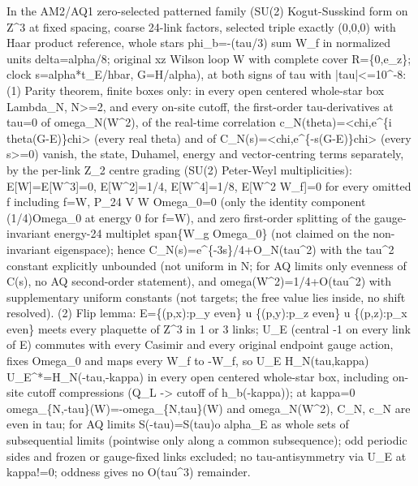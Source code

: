 \begin{gatequote}
In the AM2/AQ1 zero-selected patterned family (SU(2) Kogut-Susskind form on
Z\textasciicircum{}3 at fixed spacing, coarse 24-link factors, selected triple
exactly (0,0,0) with Haar product reference, whole stars phi\_b=-(tau/3) sum
W\_f in normalized units delta=alpha/8; original xz Wilson loop W with
complete cover R=\{0,e\_z\}; clock s=alpha*t\_E/hbar, G=H/alpha), at both
signs of tau with |tau|<=10\textasciicircum{}-8: (1) Parity theorem, finite
boxes only: in every open centered whole-star box Lambda\_N, N>=2, and every
on-site cutoff, the first-order tau-derivatives at tau=0 of
omega\_N(W\textasciicircum{}2), of the real-time correlation
c\_N(theta)=<chi,e\textasciicircum{}\{i theta(G-E)\}chi> (every real theta)
and of C\_N(s)=<chi,e\textasciicircum{}\{-s(G-E)\}chi> (every s>=0) vanish,
the state, Duhamel, energy and vector-centring terms separately, by the
per-link Z\_2 centre grading (SU(2) Peter-Weyl multiplicities):
E[W]=E[W\textasciicircum{}3]=0, E[W\textasciicircum{}2]=1/4,
E[W\textasciicircum{}4]=1/8, E[W\textasciicircum{}2 W\_f]=0 for every omitted
f including f=W, P\_24 V W Omega\_0=0 (only the identity component
(1/4)Omega\_0 at energy 0 for f=W), and zero first-order splitting of the
gauge-invariant energy-24 multiplet span\{W\_g Omega\_0\} (not claimed on the
non-invariant eigenspace); hence
C\_N(s)=e\textasciicircum{}\{-3s\}/4+O\_N(tau\textasciicircum{}2) with the
tau\textasciicircum{}2 constant explicitly unbounded (not uniform in N; for AQ
limits only evenness of C(s), no AQ second-order statement), and
omega(W\textasciicircum{}2)=1/4+O(tau\textasciicircum{}2) with supplementary
uniform constants (not targets; the free value lies inside, no shift
resolved). (2) Flip lemma: E=\{(p,x):p\_y even\} u \{(p,y):p\_z even\} u
\{(p,z):p\_x even\} meets every plaquette of Z\textasciicircum{}3 in 1 or 3
links; U\_E (central -1 on every link of E) commutes with every Casimir and
every original endpoint gauge action, fixes Omega\_0 and maps every W\_f to
-W\_f, so U\_E H\_N(tau,kappa) U\_E\textasciicircum{}*=H\_N(-tau,-kappa) in
every open centered whole-star box, including on-site cutoff compressions
(Q\_L -> cutoff of h\_b(-kappa)); at kappa=0
omega\_\{N,-tau\}(W)=-omega\_\{N,tau\}(W) and omega\_N(W\textasciicircum{}2),
C\_N, c\_N are even in tau; for AQ limits S(-tau)=S(tau)o alpha\_E as whole
sets of subsequential limits (pointwise only along a common subsequence); odd
periodic sides and frozen or gauge-fixed links excluded; no tau-antisymmetry
via U\_E at kappa!=0; oddness gives no O(tau\textasciicircum{}3) remainder.

\end{gatequote}
